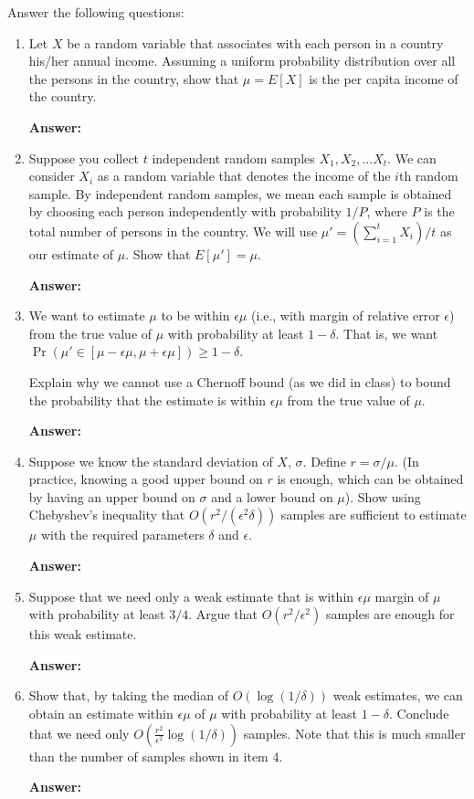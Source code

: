 \documentclass[11pt]{article}
\begin{document}
Answer the following questions:
\begin{enumerate}
    
\item Let $X$ be a random variable that associates with each person in a country his/her annual income. Assuming a uniform probability distribution over all the persons in the country,
show that   $\mu = E[X]$ is the per capita income of the country.

    \textbf{Answer:}

\item Suppose you collect $t$ independent random samples $X_1,X_2, \dots X_t$.  We can consider $X_i$ as a random variable that denotes the income of the $i$th random sample. By independent random samples, we mean each sample is obtained by choosing each person independently with probability $1/P$, where
$P$ is the total number of persons in the country. 
We will use $\mu' =  (\sum_{i =1}^t X_i)/t$
as our estimate of $\mu$.
Show that $E[\mu'] = \mu$.

    \textbf{Answer:}

\item  We want to estimate $\mu$ to be within $\epsilon\mu$ (i.e., with margin of relative error $\epsilon$) from the true value of
$\mu$ with probability at least $1-\delta$.  That is, we
want $\Pr(\mu' \in [\mu - \epsilon\mu, \mu + \epsilon\mu]) \geq 1-\delta$.

 Explain why we cannot use a Chernoff bound (as we did in class) to bound the probability that the estimate is within  $\epsilon \mu$ from the true value of $\mu$.

    \textbf{Answer:}
 
\item Suppose we know the standard deviation of $X$, $\sigma$. 
Define $ r = \sigma/\mu$. (In practice, knowing a good upper bound on $r$ is enough, which can be obtained by having
an upper bound on $\sigma$ and a lower bound on $\mu$). Show using Chebyshev's inequality that $O(r^2/(\epsilon^2\delta))$ samples are sufficient to estimate $\mu$ with the required parameters $\delta$ and $\epsilon$.

    \textbf{Answer:}

\item  Suppose that we need only a weak estimate that is within $\epsilon \mu$ margin  of $\mu$ with probability at least
$3/4$. Argue that $O(r^2/\epsilon^2)$ samples are enough for this weak estimate.

    \textbf{Answer:}

\item Show that, by taking the median of $O(\log(1/\delta))$ weak estimates, we can obtain an estimate within
$\epsilon \mu$ of $\mu$ with probability at least $1 - \delta$. Conclude that we need only
$O(\frac{r^2}{\epsilon^2} \log (1/\delta))$ samples. Note that this is much smaller than the number of samples shown in item 4.

    \textbf{Answer:}

\end{enumerate}
\end{document}
